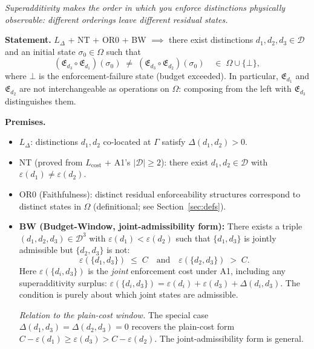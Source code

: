 \documentclass[11pt]{article}
\theoremstyle{remark}
\newenvironment{varlist}{\begin{itemize}[nosep,leftmargin=2em]}{\end{itemize}}
\begin{document}
\begin{tcolorbox}[apfbox, title={Theorem T1 --- The Bridge Theorem (Order-Dependence)}]
\textit{Superadditivity makes the order in which you enforce distinctions physically observable: different orderings leave different residual states.}

\smallskip\noindent\textbf{Statement.}  $L_\Delta$ + NT + OR0 + BW $\implies$ there exist distinctions $d_1, d_2, d_3 \in \mathcal{D}$ and an initial state $\sigma_0 \in \Omega$ such that
\[
(\mathfrak{E}_{d_3} \circ \mathfrak{E}_{d_1})(\sigma_0) \;\ne\; (\mathfrak{E}_{d_3} \circ \mathfrak{E}_{d_2})(\sigma_0) \quad \in\; \Omega \cup \{\bot\},
\]
where $\bot$ is the enforcement-failure state (budget exceeded).  In particular, $\mathfrak{E}_{d_1}$ and $\mathfrak{E}_{d_2}$ are not interchangeable as operations on $\Omega$: composing from the left with $\mathfrak{E}_{d_3}$ distinguishes them.

\smallskip\noindent\textbf{Premises.}
\begin{varlist}
\item $L_\Delta$: distinctions $d_1, d_2$ co-located at $\Gamma$ satisfy $\Delta(d_1,d_2) > 0$.
\item NT (proved from $L_{\mathrm{cost}}$ + A1's $|\mathcal{D}| \ge 2$): there exist $d_1, d_2 \in \mathcal{D}$ with $\varepsilon(d_1) \ne \varepsilon(d_2)$.
\item OR0 (Faithfulness): distinct residual enforceability structures correspond to distinct states in $\Omega$ (definitional; see Section~\ref{sec:defs}).
\item \textbf{BW (Budget-Window, joint-admissibility form):}  There exists a triple $(d_1, d_2, d_3) \in \mathcal{D}^3$ with $\varepsilon(d_1) < \varepsilon(d_2)$ such that $\{d_1, d_3\}$ is jointly admissible but $\{d_2, d_3\}$ is not:
\[
\varepsilon(\{d_1, d_3\}) \;\le\; C \quad\text{and}\quad \varepsilon(\{d_2, d_3\}) \;>\; C.
\]
Here $\varepsilon(\{d_i, d_3\})$ is the \emph{joint} enforcement cost under A1, including any superadditivity surplus: $\varepsilon(\{d_i,d_3\}) = \varepsilon(d_i) + \varepsilon(d_3) + \Delta(d_i,d_3)$.  The condition is purely about which joint states are admissible.

\textit{Relation to the plain-cost window.}  The special case $\Delta(d_1,d_3) = \Delta(d_2,d_3) = 0$ recovers the plain-cost form $C - \varepsilon(d_1) \ge \varepsilon(d_3) > C - \varepsilon(d_2)$.  The joint-admissibility form is general.


\end{varlist}
\end{tcolorbox}
\end{document}
